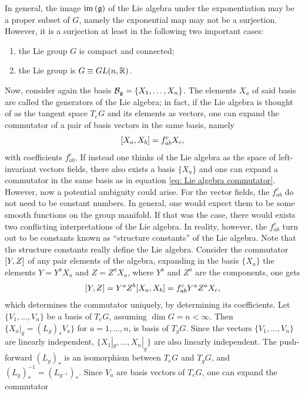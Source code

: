 In general, the image $\mathrm{im}\,{(}\mathfrak{g})$ of the Lie algebra under the exponentiation may be a proper subset of $G$, namely the exponential map may not be a surjection. However, it is a surjection at least in the following two important cases:
\begin{enumerate}
    \item the Lie group $G$ is compact and connected;
    \item the Lie group is $G \equiv GL(n,\mathbb{R})$.
\end{enumerate}
Now, consider again the basis $\mathcal{B}_{\mathfrak{g}} = \{X_1,\dots,X_n\}$. The elements $X_a$ of said basis are called the generators of the Lie algebra; in fact, if the Lie algebra is thought of as the tangent space $T_eG$ and its elements as vectors, one can expand the commutator of a pair of basis vectors in the same basis, namely
\begin{equation}
\label{eq: Lie algebra commutator}
    [X_a,X_b] = f_{ab}^cX_c,
\end{equation}
with coefficients $f_{ab}^c$. If instead one thinks of the Lie algebra as the space of left-invariant vectors fields, there also exists a basis $\{X_a\}$ and one can expand a commutator in the same basis as in equation \eqref{eq: Lie algebra commutator}. However, now a potential ambiguity could arise. For the vector fields, the $f_{ab}^c$ do not need to be constant numbers. In general, one would expect them to be some smooth functions on the group manifold. If that was the case, there would exists two conflicting interpretations of the Lie algebra. In reality, however, the $f_{ab}^c$ turn out to be constants known as ``structure constants'' of the Lie algebra. Note that the structure constants really define the Lie algebra. Consider the commutator $[Y,Z]$ of any pair elements of the algebra, expanding in the basis $\{X_a\}$ the elements $Y = Y^aX_a$ and $Z = Z^aX_a$, where $Y^a$ and $Z^a$ are the components, one gets
\begin{equation}
    [Y,Z] = Y^aZ^b[X_a,X_b] = f_{ab}^cY^aZ^aX_c,
\end{equation}
which determines the commutator uniquely, by determining its coefficients. Let $\{V_1,\dots,V_n\}$ be a basis of $T_eG$, assuming $\dim{G} = n < \infty$. Then $\{X_a|_g = (L_g)_*V_a\}$ for $a = 1,\dots,n$, is basis of $T_gG$. Since the vectors $\{V_1,\dots,V_n\}$ are linearly independent, $\{X_1|_g,\dots,X_n|_g\}$ are also linearly independent. The push-forward $(L_g)_*$ is an isomorphism between $T_eG$ and $T_gG$, and $(L_g)_*^{-1} = (L_{g^{-1}})_*$. Since $V_a$ are basis vectors of $T_eG$, one can expand the commutator 
